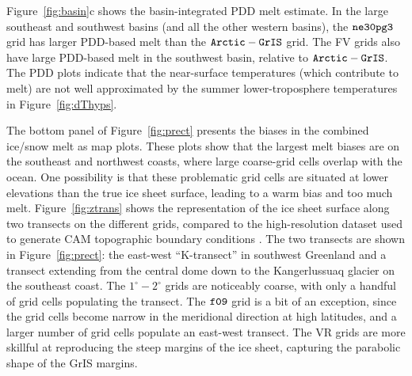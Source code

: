 \documentclass[draft]{agujournal2019}
\begin{document}
Figure~\ref{fig:basin}c shows the basin-integrated PDD melt estimate.  In the large southeast and southwest basins (and all the other western basins), the $\tt ne30pg3$ grid has larger PDD-based melt than the $\tt Arctic-GrIS$ grid. The FV grids also have large PDD-based melt in the southwest basin, relative to $\tt Arctic-GrIS$. The PDD plots indicate that the near-surface temperatures (which contribute to melt) are not well approximated by the summer lower-troposphere temperatures in Figure~\ref{fig:dThyps}.

The bottom panel of Figure~\ref{fig:prect} presents the biases in the combined ice/snow melt as map plots. These plots show that the largest melt biases are on the southeast and northwest coasts, where large coarse-grid cells overlap with the ocean. One possibility is that these problematic grid cells are situated at lower elevations than the true ice sheet surface, leading to a warm bias and too much melt. Figure~\ref{fig:ztrans} shows the representation of the ice sheet surface along two transects on the different grids, compared to the high-resolution dataset used to generate CAM topographic boundary conditions \cite{GMTED2010,gmdd-8-4623-2015}. The two transects are shown in Figure~\ref{fig:prect}: the east-west ``K-transect'' in southwest Greenland and a transect extending from the central dome down to the  Kangerlussuaq glacier on the southeast coast. The $1^{\circ}-2^{\circ}$ grids are noticeably coarse, with only a handful of grid cells populating the transect. The $\tt f09$ grid is a bit of an exception, since the grid cells become narrow in the meridional direction at high latitudes, and a larger number of grid cells populate an east-west transect. The VR grids are more skillful at reproducing the steep margins of the ice sheet, capturing the parabolic shape of the GrIS margins.
\end{document}
